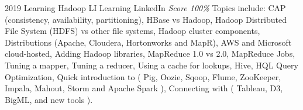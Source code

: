 \documentclass[11pt,a4paper]{moderncv}
\begin{document}
\cventry
    {2019}
    {Learning Hadoop}
    {LI Learning}
    {LinkedIn}
    {\textit{Score 100\%}}
    {
        Topics include:                                                         %
            CAP (consistency, availability, partitioning),                      %
            HBase vs Hadoop,                                                    %
            Hadoop Distributed File System (HDFS) vs other file systems,        %
            Hadoop cluster components,                                          %
            Distributions (Apache, Cloudera, Hortonworks and MapR),             %
            AWS and Microsoft cloud-hosted,                                     %
            Adding Hadoop libraries,                                            %
            MapReduce 1.0 vs 2.0,                                               %
            MapReduce Jobs,                                                     %
            Tuning a mapper,                                                    %
            Tuning a reducer,                                                   %
            Using a cache for lookups,                                          %
            Hive,                                                               %
            HQL Query Optimization,                                             %
            Quick introduction to (                                             %
                Pig,                                                            %
                Oozie,                                                          %
                Sqoop,                                                          %
                Flume,                                                          %
                ZooKeeper,                                                      %
                Impala,                                                         %
                Mahout,                                                         %
                Storm and                                                       %
                Apache Spark                                                    %
                ),                                                              %
            Connecting with (                                                   %
                Tableau,                                                        %
                D3,                                                             %
                BigML,                                                          %
                and new tools                                                   %
                ).                                                              %
    }
\end{document}
